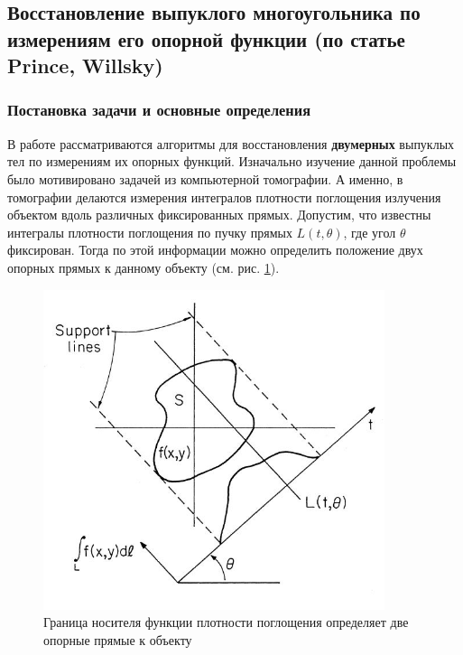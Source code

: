 \documentclass[a4paper, 12pt, titlepage]{article}
\theoremstyle{definition}
\theoremstyle{plain}
\theoremstyle{plain}
\begin{document}

\newpage
\subsection{Восстановление выпуклого многоугольника по измерениям его опорной
функции (по статье Prince, Willsky)}
\label{sec:history/PrinceW90}

\subsubsection{Постановка задачи и основные определения}
\label{sec:history/PrinceW90/problem}

В работе \cite[Prince - Willsky (1990)]{journals/pami/PrinceW90}
рассматриваются алгоритмы для восстановления \textbf{двумерных} выпуклых тел по
измерениям их опорных функций. Изначально изучение данной проблемы было
мотивировано задачей из компьютерной томографии. А именно, в томографии
делаются измерения интегралов плотности поглощения излучения объектом вдоль
различных фиксированных прямых. Допустим, что известны интегралы плотности
поглощения по пучку прямых $L(t, \theta)$, где угол $\theta$ фиксирован. Тогда
по этой информации можно определить положение двух опорных прямых к данному
объекту (см. рис. \ref{tomography-application}).

\begin{figure}[ht]
    \includegraphics[width=10cm]{images/tomography-application.jpg}
    \caption{Граница носителя функции плотности поглощения определяет две
    опорные прямые к объекту}
    \label{tomography-application}
\end{figure}
\end{document}
